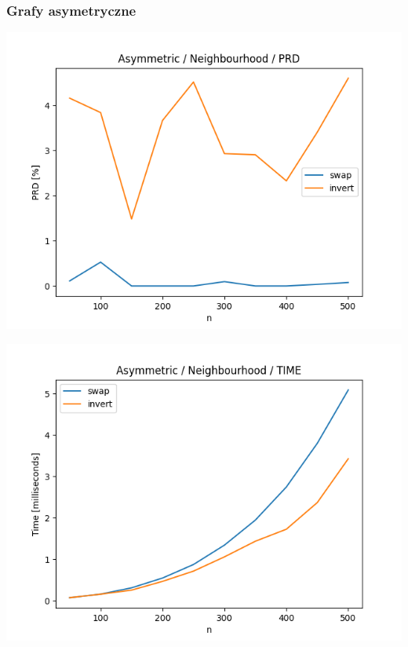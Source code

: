 \documentclass{article}
\begin{document}
\subsubsection{Grafy asymetryczne}

\begin{center}
\includegraphics[width=\textwidth, 
                   height = 0.4\textheight, 
                   keepaspectratio]
                  {plots/neighbours_asymmetric_prd} 
\end{center}

\begin{center}
\includegraphics[width=\textwidth, 
                   height = 0.4\textheight, 
                   keepaspectratio]
                  {plots/neighbours_asymmetric_time} 
\end{center}
\end{document}

